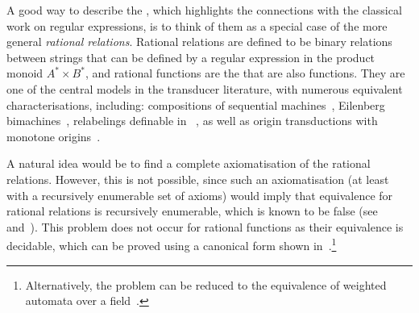 A good way to describe the , which highlights the connections with the classical work on regular expressions, is to think of them as a special case of the more general \emph{rational relations}. Rational relations are defined to be binary relations between strings that can be defined by a regular expression in the product monoid $A^* \times B^*$, and rational functions are the  that are also functions. They are one of the central models in the transducer literature, with numerous equivalent characterisations, including:  compositions of sequential machines~\cite[Proposition 7.4]{Elgot1965}, Eilenberg  bimachines~\cite[Chapter XI]{Eilenberg1974}, relabelings definable in \mso~\cite[Section C.4.2]{Bojanczyk2026}, as well as origin transductions with monotone origins~\cite[Theorem 3]{Bojanczyk2014}.

A natural idea would be to find a complete axiomatisation of the rational relations. However, this is not possible, since such an axiomatisation (at least with a recursively enumerable set of axioms) would imply that equivalence for rational relations is recursively enumerable, which is known to be false (see~\cite[p.~412]{Griffiths1968} and~\cite[Theorem 7]{FischerRosenberg1968}). 
This problem does not occur for rational functions as their equivalence is decidable, which can be proved using a canonical form shown in~\cite[Theorem 2]{ReutenauerSchutzenberger1991}.\footnote{Alternatively, the problem can be reduced to the equivalence of weighted automata over a field~\cite[Section B.3]{Bojanczyk2026}.}

